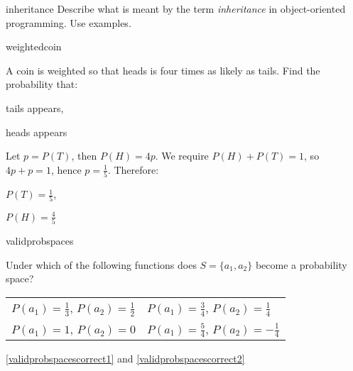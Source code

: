 
\begin{defproblem}{inheritance}
 Describe what is meant by the term \emph{inheritance} in
 object-oriented programming. Use examples.
\end{defproblem}

\begin{defproblem}{weightedcoin}%
  \begin{onlyproblem}
    A coin is weighted so that heads is four times as likely
    as tails. Find the probability that:
    \begin{textenum}
      \item tails appears,
      \item heads appears
    \end{textenum}%
  \end{onlyproblem}%
  \begin{onlysolution}
    Let $p=P(T)$, then $P(H)=4p$. We require $P(H)+P(T)=1$,
    so $4p+p=1$, hence $p=\frac{1}{5}$. Therefore:
    \begin{textenum}
      \item $P(T)=\frac{1}{5}$,
      \item $P(H)=\frac{4}{5}$
    \end{textenum}
  \end{onlysolution}
\end{defproblem}

\begin{defproblem}{validprobspaces}
\begin{onlyproblem}%
Under which of the following functions does
$S=\{a_1,a_2\}$ become a probability space?
\par
\begin{textenum}
\begin{tabular}{ll}
\item $P(a_1)=\frac{1}{3}$, $P(a_2)=\frac{1}{2}$
&
\item\label{validprobspacescorrect1} $P(a_1)=\frac{3}{4}$,
$P(a_2)=\frac{1}{4}$
\\
\item\label{validprobspacescorrect2} $P(a_1)=1$, $P(a_2)=0$
&
\item $P(a_1)=\frac{5}{4}$, $P(a_2)=-\frac{1}{4}$
\end{tabular}
\end{textenum}
\end{onlyproblem}%
\begin{onlysolution}%
\ref{validprobspacescorrect1} and \ref{validprobspacescorrect2}%
\end{onlysolution}
\end{defproblem}


